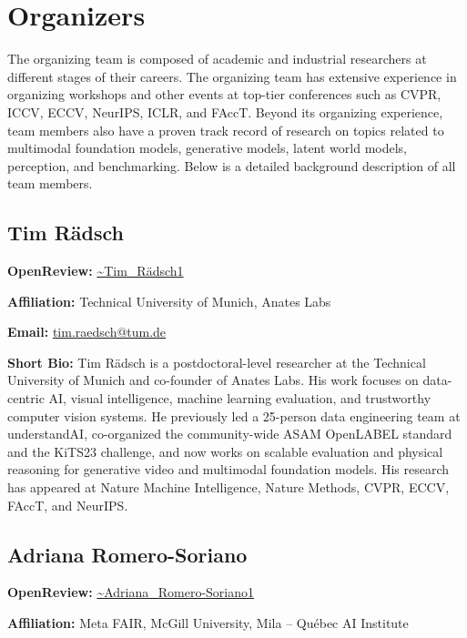 \documentclass[11pt]{article}
\begin{document}
\section{Organizers}

The organizing team is composed of academic and industrial researchers at different stages of their careers. The organizing team has extensive experience in organizing workshops and other events at top-tier conferences such as CVPR, ICCV, ECCV, NeurIPS, ICLR, and FAccT. Beyond its organizing experience, team members also have a proven track record of research on topics related to multimodal foundation models, generative models, latent world models, perception, and benchmarking. Below is a detailed background description of all team members.


\subsection{Tim Rädsch}

\textbf{OpenReview:} \href{https://openreview.net/profile?id=\string~Tim\_R\%C3\%A4dsch1}{\textasciitilde{}Tim\_Rädsch1}


\textbf{Affiliation:} Technical University of Munich, Anates Labs


\textbf{Email:} \href{mailto:tim.raedsch@tum.de}{tim.raedsch@tum.de}


\textbf{Short Bio:} Tim Rädsch is a postdoctoral-level researcher at the Technical University of Munich and co-founder of Anates Labs. His work focuses on data-centric AI, visual intelligence, machine learning evaluation, and trustworthy computer vision systems. He previously led a 25-person data engineering team at understandAI, co-organized the community-wide ASAM OpenLABEL standard and the KiTS23 challenge, and now works on scalable evaluation and physical reasoning for generative video and multimodal foundation models. His research has appeared at Nature Machine Intelligence, Nature Methods, CVPR, ECCV, FAccT, and NeurIPS.


\subsection{Adriana Romero-Soriano}

\textbf{OpenReview:} \href{https://openreview.net/profile?id=\string~Adriana\_Romero-Soriano1}{\textasciitilde{}Adriana\_Romero-Soriano1}


\textbf{Affiliation:} Meta FAIR, McGill University, Mila -- Québec AI Institute
\end{document}
